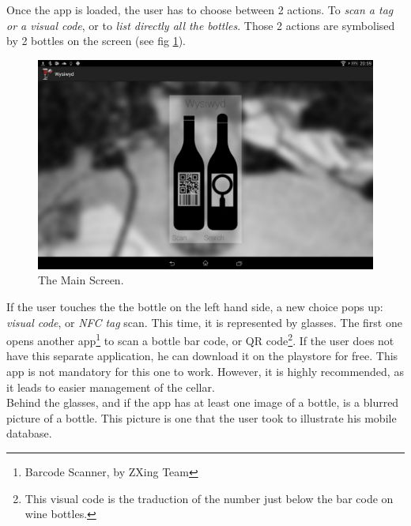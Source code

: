 Once the app is loaded, the user has to choose between 2 actions. To \emph{scan a tag or a visual code}, or to \emph{list directly all the bottles}. Those 2 actions are symbolised by 2 bottles on the screen (see fig \ref{main_screen}).

\begin{figure}[H]
\begin{center}
	\includegraphics[width=\textwidth]{Images/MainActivity.png}
	\caption{The Main Screen.}
	\label{main_screen}
\end{center}
\end{figure}

If the user touches the the bottle on the left hand side, a new choice pops up: \emph{visual code}, or \emph{NFC tag} scan. This time, it is represented by glasses. The first one opens another app\footnote{Barcode Scanner, by ZXing Team} to scan a bottle bar code, or QR code\footnote{This visual code is the traduction of the number just below the bar code on wine bottles.}. If the user does not have this separate application, he can download it on the playstore for free. This app is not mandatory for this one to work. However, it is highly recommended, as it leads to easier management of the cellar.\\

Behind the glasses, and if the app has at least one image of a bottle, is a blurred picture of a bottle. This picture is one that the user took to illustrate his mobile database.


